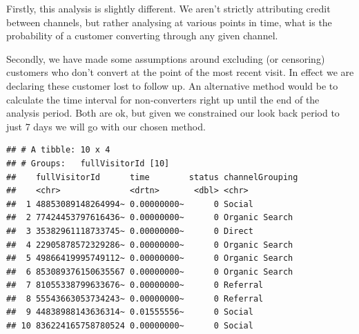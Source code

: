\documentclass[]{book}
\newenvironment{Shaded}{\begin{snugshade}}{\end{snugshade}}
\newcommand{\DataTypeTok}[1]{\textcolor[rgb]{0.13,0.29,0.53}{#1}}
\newcommand{\DecValTok}[1]{\textcolor[rgb]{0.00,0.00,0.81}{#1}}
\newcommand{\KeywordTok}[1]{\textcolor[rgb]{0.13,0.29,0.53}{\textbf{#1}}}
\newcommand{\NormalTok}[1]{#1}
\newcommand{\OperatorTok}[1]{\textcolor[rgb]{0.81,0.36,0.00}{\textbf{#1}}}
\newcommand{\StringTok}[1]{\textcolor[rgb]{0.31,0.60,0.02}{#1}}
\begin{document}
Firstly, this analysis is slightly different. We aren't strictly attributing
credit between channels, but rather analysing at various points in time, what
is the probability of a customer converting through any given channel.

Secondly, we have made some assumptions around excluding (or censoring) customers
who don't convert at the point of the most recent visit. In effect we are declaring
these customer lost to follow up. An alternative method
would be to calculate the time interval for non-converters right up until the
end of the analysis period. Both are ok, but given we constrained our look back
period to just 7 days we will go with our chosen method.

\begin{Shaded}
\end{Shaded}

\begin{verbatim}
## # A tibble: 10 x 4
## # Groups:   fullVisitorId [10]
##    fullVisitorId      time        status channelGrouping
##    <chr>              <drtn>       <dbl> <chr>          
##  1 48853089148264994~ 0.00000000~      0 Social         
##  2 77424453797616436~ 0.00000000~      0 Organic Search 
##  3 35382961118733745~ 0.00000000~      0 Direct         
##  4 22905878572329286~ 0.00000000~      0 Organic Search 
##  5 49866419995749112~ 0.00000000~      0 Organic Search 
##  6 853089376150635567 0.00000000~      0 Organic Search 
##  7 81055338799633676~ 0.00000000~      0 Referral       
##  8 55543663053734243~ 0.00000000~      0 Referral       
##  9 44838988143636314~ 0.01555556~      0 Social         
## 10 836224165758780524 0.00000000~      0 Social
\end{verbatim}
\end{document}
